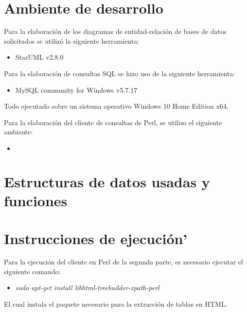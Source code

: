 \documentclass{IEEEtran}
\begin{document}
\section{Ambiente de desarrollo}
Para la elaboraci\'on de los diagramas de entidad-relaci\'on de bases de datos solicitados se utiliz\'o la siguiente herramienta:
\begin{itemize}
  \item StarUML v2.8.0
\end{itemize}

Para la elaboraci\'on de consultas SQL se hizo uso de la siguiente herramienta:
\begin{itemize}
  \item MySQL community for Windows v5.7.17
\end{itemize}
Todo ejecutado sobre un sistema operativo Windows 10 Home Edition x64.

Para la elaboraci\'on del cliente de consultas de Perl, se utilizo el siguiente ambiente:
\begin{itemize}
  \item
\end{itemize}

\section{Estructuras de datos usadas y funciones}

\section{Instrucciones de ejecuci\'on'}
Para la ejecuci\'on del cliente en Perl de la segunda parte, es necesario ejecutar el siguiente comando:
\begin{itemize}
  \item \emph{sudo apt-get install libhtml-treebuilder-xpath-perl}
\end{itemize}
El cual instala el paquete necesario para la extracci\'on de tablas en HTML.
\end{document}
